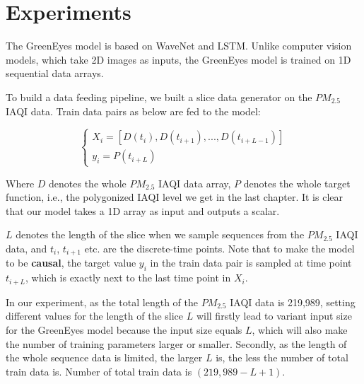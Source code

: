 \chapter{Experiments}\label{chap:experiments}


The GreenEyes model is based on WaveNet and LSTM. Unlike computer vision models, which take 2D images as inputs, the GreenEyes model is trained on 1D sequential data arrays.

To build a data feeding pipeline, we built a slice data generator on the $PM_{2.5}$ IAQI data. Train data pairs as below are fed to the model:

\begin{equation}
\left\{
    \begin{array}{l}
    X_i=[D(t_i),D(t_{i+1}),...,D(t_{i+L-1})] \\
    y_i=P(t_{i+L})
    \end{array}
\right.
\end{equation}


Where $D$ denotes the whole $PM_{2.5}$ IAQI data array, $P$ denotes the whole target function, i.e., the polygonized IAQI level we get in the last chapter. It is clear that our model takes a 1D array as input and outputs a scalar.

$L$ denotes the length of the slice when we sample sequences from the $PM_{2.5}$ IAQI data, and $t_i$, $t_{i+1}$ etc. are the discrete-time points. Note that to make the model to be \textbf{causal}, the target value $y_i$ in the train data pair is sampled at time point $t_{i+L}$, which is exactly next to the last time point in $X_i$.

In our experiment, as the total length of the $PM_{2.5}$ IAQI data is 219,989, setting different values for the length of the slice $L$ will firstly lead to variant input size for the GreenEyes model because the input size equals $L$, which will also make the number of training parameters larger or smaller. Secondly, as the length of the whole sequence data is limited, the larger $L$ is, the less the number of total train data is. Number of total train data is $(219,989-L+1)$.

